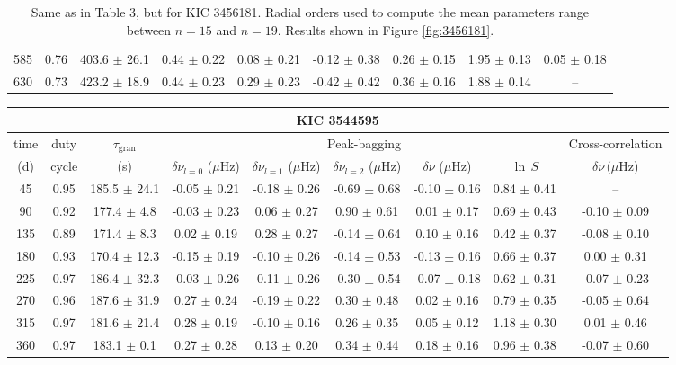 \documentclass[twocolumn]{aastex61}%
\begin{document}
\begin{table*}[ht]
\begin{tabular}{ccc|ccccc|c}
585 & 0.76 & 403.6 $\pm$ 26.1 & 0.44 $\pm$ 0.22 & 0.08 $\pm$ 0.21 & -0.12 $\pm$ 0.38 & 0.26 $\pm$ 0.15 & 1.95 $\pm$ 0.13 & 0.05 $\pm$ 0.18\\
630 & 0.73 & 423.2 $\pm$ 18.9 & 0.44 $\pm$ 0.23 & 0.29 $\pm$ 0.23 & -0.42 $\pm$ 0.42 & 0.36 $\pm$ 0.16 & 1.88 $\pm$ 0.14 & --\\
\end{tabular}
\caption{Same as in Table 3, but for KIC 3456181. Radial orders used to compute the mean parameters range between $n=15$ and $n=19$. Results shown in Figure \ref{fig:3456181}.}\label{tab:3456181}
\end{table*}

\begin{table*}[ht]\centering\fontsize{9.}{7.}\selectfont
\begin{tabular}{ccc|ccccc|c}
\multicolumn{9}{c}{KIC 3544595}\\ \hline\hline
time & duty & $\tau_\text{gran}$ &\multicolumn{5}{c|}{Peak-bagging}&Cross-correlation\\
(d)& cycle & (s)&$\delta\nu_{l=0}$ ($\mu$Hz) & $\delta\nu_{l=1}$ ($\mu$Hz) & $\delta\nu_{l=2}$ ($\mu$Hz) & $\delta\nu$ ($\mu$Hz)& $\ln\,S$ & $\delta\nu\,(\mu$Hz)\\\hline
45 & 0.95 & 185.5 $\pm$ 24.1 & -0.05 $\pm$ 0.21 & -0.18 $\pm$ 0.26 & -0.69 $\pm$ 0.68 & -0.10 $\pm$ 0.16 & 0.84 $\pm$ 0.41 & --\\
90 & 0.92 & 177.4 $\pm$ 4.8 & -0.03 $\pm$ 0.23 & 0.06 $\pm$ 0.27 & 0.90 $\pm$ 0.61 & 0.01 $\pm$ 0.17 & 0.69 $\pm$ 0.43 & -0.10 $\pm$ 0.09\\
135 & 0.89 & 171.4 $\pm$ 8.3 & 0.02 $\pm$ 0.19 & 0.28 $\pm$ 0.27 & -0.14 $\pm$ 0.64 & 0.10 $\pm$ 0.16 & 0.42 $\pm$ 0.37 & -0.08 $\pm$ 0.10\\
180 & 0.93 & 170.4 $\pm$ 12.3 & -0.15 $\pm$ 0.19 & -0.10 $\pm$ 0.26 & -0.14 $\pm$ 0.53 & -0.13 $\pm$ 0.16 & 0.66 $\pm$ 0.37 & 0.00 $\pm$ 0.31\\
225 & 0.97 & 186.4 $\pm$ 32.3 & -0.03 $\pm$ 0.26 & -0.11 $\pm$ 0.26 & -0.30 $\pm$ 0.54 & -0.07 $\pm$ 0.18 & 0.62 $\pm$ 0.31 & -0.07 $\pm$ 0.23\\
270 & 0.96 & 187.6 $\pm$ 31.9 & 0.27 $\pm$ 0.24 & -0.19 $\pm$ 0.22 & 0.30 $\pm$ 0.48 & 0.02 $\pm$ 0.16 & 0.79 $\pm$ 0.35 & -0.05 $\pm$ 0.64\\
315 & 0.97 & 181.6 $\pm$ 21.4 & 0.28 $\pm$ 0.19 & -0.10 $\pm$ 0.16 & 0.26 $\pm$ 0.35 & 0.05 $\pm$ 0.12 & 1.18 $\pm$ 0.30 & 0.01 $\pm$ 0.46\\
360 & 0.97 & 183.1 $\pm$ 0.1 & 0.27 $\pm$ 0.28 & 0.13 $\pm$ 0.20 & 0.34 $\pm$ 0.44 & 0.18 $\pm$ 0.16 & 0.96 $\pm$ 0.38 & -0.07 $\pm$ 0.60\\

\end{tabular}
\end{table*}
\end{document}

